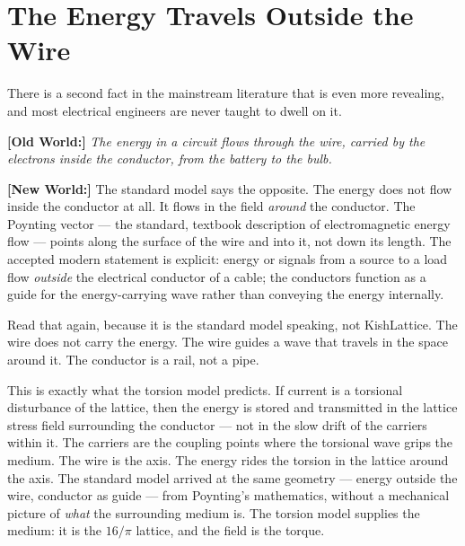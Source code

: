 \documentclass[11pt, letterpaper, openany]{book}
\newcommand{\oldworld}[1]{\noindent\textbf{\color{goldseal}[Old World:]}
  \textit{#1}\medskip}
\newcommand{\newworldcmd}[1]{\noindent\textbf{\color{kishblue}[New World:]}
  #1\medskip}
\begin{document}
\section{The Energy Travels Outside the Wire}
 
There is a second fact in the mainstream literature that is even more
revealing, and most electrical engineers are never taught to dwell on it.
 
\oldworld{The energy in a circuit flows through the wire, carried by the
electrons inside the conductor, from the battery to the bulb.}
 
\newworldcmd{The standard model says the opposite. The energy does not
flow inside the conductor at all. It flows in the field \emph{around} the
conductor. The Poynting vector --- the standard, textbook description of
electromagnetic energy flow --- points along the surface of the wire and
into it, not down its length. The accepted modern statement is explicit:
energy or signals from a source to a load flow \emph{outside} the
electrical conductor of a cable; the conductors function as a guide for
the energy-carrying wave rather than conveying the energy internally.
 
Read that again, because it is the standard model speaking, not
KishLattice. The wire does not carry the energy. The wire guides a wave
that travels in the space around it. The conductor is a rail, not a pipe.
 
This is exactly what the torsion model predicts. If current is a torsional
disturbance of the lattice, then the energy is stored and transmitted in
the lattice stress field surrounding the conductor --- not in the slow
drift of the carriers within it. The carriers are the coupling points
where the torsional wave grips the medium. The wire is the axis. The energy
rides the torsion in the lattice around the axis. The standard model
arrived at the same geometry --- energy outside the wire, conductor as
guide --- from Poynting's mathematics, without a mechanical picture of
\emph{what} the surrounding medium is. The torsion model supplies the
medium: it is the $16/\pi$ lattice, and the field is the torque.}
 
\end{document}
